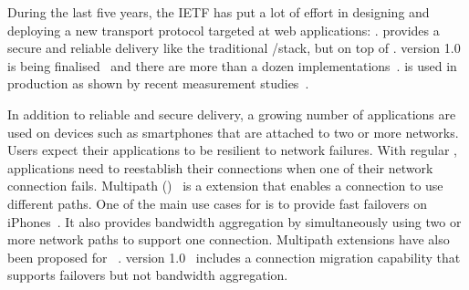 During the last five years, the IETF has put a lot of effort
in designing and deploying a new transport protocol targeted at web
applications: \quic \cite{langley2017quic}. \quic provides a secure and
reliable delivery like the traditional \tls/\tcp stack, but on top of \udp.
\quic
version 1.0 is being finalised~\cite{draft-ietf-quic-transport} and there are
more than a dozen implementations~\cite{quicimplem,marx2020same}. \quic is used
in production as shown by recent measurement studies~\cite{trevisan2020five}.



In addition to reliable and secure delivery, a growing number of applications
are used on devices such as smartphones that are attached to two or more
networks. Users expect their applications to be resilient to network failures.
With regular \tcp, applications need to reestablish their connections when one
of their network connection fails. Multipath \tcp
(\mptcp)~\cite{rfc8684,raiciu2012hard} is a \tcp extension that enables a
connection to use different paths. One of the main use cases for \mptcp is to
provide fast failovers on iPhones~\cite{bonaventure2016multipath}. It also
provides bandwidth aggregation by simultaneously using two or more network paths
to support one connection. Multipath extensions have also been proposed for
\quic~\cite{viernickel2018multipath,de2017multipath}. \quic version
1.0~\cite{draft-ietf-quic-transport} includes a connection migration capability
that supports failovers but not bandwidth aggregation.









